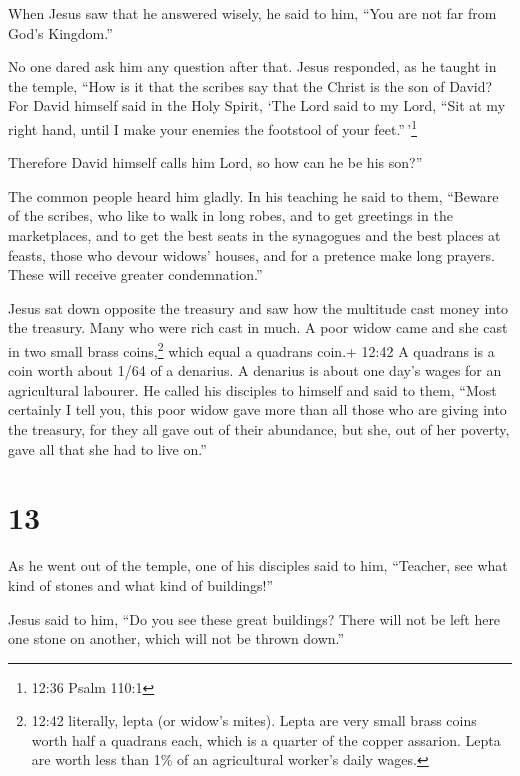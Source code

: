 When Jesus saw that he answered wisely, he said to him,
``You are not far from God's Kingdom.''

No one dared ask him any question after that.  Jesus
responded, as he taught in the temple, ``How is it that the scribes say
that the Christ is the son of David?  For David himself
said in the Holy Spirit, `The Lord said to my Lord, ``Sit at my right
hand, until I make your enemies the footstool of your
feet.''\,'\footnote{12:36 Psalm 110:1}

 Therefore David himself calls him Lord, so how can he be
his son?''

The common people heard him gladly.  In his teaching he
said to them, ``Beware of the scribes, who like to walk in long robes,
and to get greetings in the marketplaces,  and to get the
best seats in the synagogues and the best places at feasts,
 those who devour widows' houses, and for a pretence make
long prayers. These will receive greater condemnation.''

 Jesus sat down opposite the treasury and saw how the
multitude cast money into the treasury. Many who were rich cast in much.
 A poor widow came and she cast in two small brass
coins,\footnote{12:42 literally, lepta (or widow's mites). Lepta are
  very small brass coins worth half a quadrans each, which is a quarter
  of the copper assarion. Lepta are worth less than 1\% of an
  agricultural worker's daily wages.} which equal a quadrans coin.+
12:42 A quadrans is a coin worth about 1/64 of a denarius. A denarius is
about one day's wages for an agricultural labourer.  He
called his disciples to himself and said to them, ``Most certainly I
tell you, this poor widow gave more than all those who are giving into
the treasury,  for they all gave out of their abundance,
but she, out of her poverty, gave all that she had to live on.''

\hypertarget{section-12}{%
\section{13}\label{section-12}}

 As he went out of the temple, one of his disciples said to
him, ``Teacher, see what kind of stones and what kind of buildings!''

 Jesus said to him, ``Do you see these great buildings?
There will not be left here one stone on another, which will not be
thrown down.''


